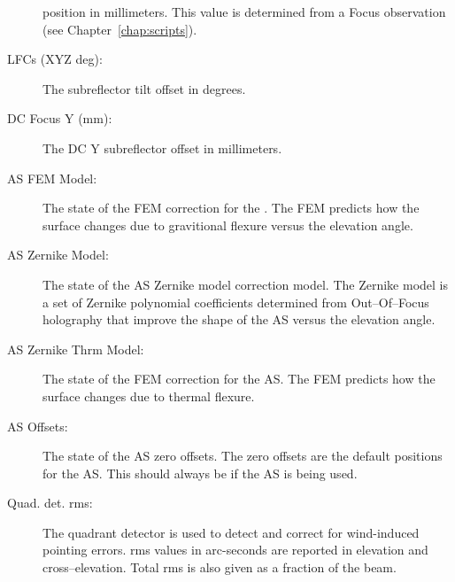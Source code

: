 \begin{description}
position in millimeters.  This value is determined from a Focus observation
(see Chapter~\ref{chap:scripts}).
\item[LFCs (XYZ deg):] The subreflector tilt offset in degrees.
\item[DC Focus Y (mm):] The \gls{DC} Y subreflector offset in millimeters.
\item[AS FEM Model:] The  state of the \gls{FEM} correction for the .
The \gls{FEM} predicts how the surface changes due to gravitional flexure versus the
elevation angle.
\item[AS Zernike Model:] The  state of the \gls{AS} Zernike model correction model.
The Zernike model is a set of Zernike polynomial coefficients determined from
Out--Of--Focus holography that improve the shape of the \gls{AS} versus the elevation
angle.
\item[AS Zernike Thrm Model:] The  state of the \gls{FEM} correction for the \gls{AS}.
The \gls{FEM} predicts how the surface changes due to thermal flexure.
\item[AS Offsets:] The  state of the \gls{AS} zero offsets. The zero offsets are the
default positions for the \gls{AS}.  This should always be  if the \gls{AS} is being
used.
\item[Quad. det. rms:] The quadrant detector is used to detect and correct for
wind-induced pointing errors.  rms values in arc-seconds are reported in elevation
and cross--elevation.  Total rms is also given as a fraction of the beam.
\end{description}

